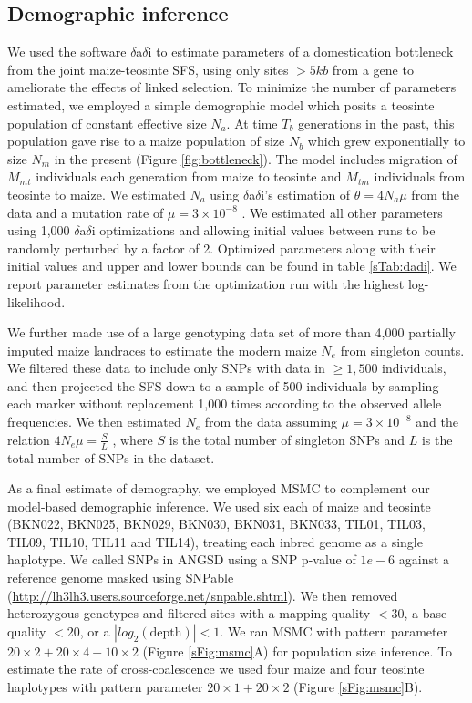 \documentclass[12pt,a4paper]{article}
\begin{document}
\subsection*{Demographic inference}
We used the software $\delta$a$\delta$i \cite{gutenkunst2009} to estimate parameters of a domestication bottleneck from the joint maize-teosinte SFS, using only sites $>5 kb$ from a gene to ameliorate the effects of linked selection.
To minimize the number of parameters estimated, we employed a simple demographic model which posits a teosinte population of constant effective size $N_a$.  At time $T_b$ generations in the past, this population gave rise to a maize population of size $N_b$ which grew exponentially to size $N_m$ in the present (Figure \ref{fig:bottleneck}).
The model includes migration of $M_{mt}$ individuals each generation from maize to teosinte and $M_{tm}$ individuals from teosinte to maize.  We estimated $N_a$ using $\delta$a$\delta$i's estimation of $\theta=4N_a\mu$ from the data and a mutation rate of $\mu = 3 \times 10^{-8}$ \cite{clark2005}. 
We estimated all other parameters using 1,000 $\delta$a$\delta$i optimizations and allowing initial values between runs to be randomly perturbed by a factor of 2.  
Optimized parameters along with their initial values and upper and lower bounds can be found in table \ref{sTab:dadi}. We report parameter estimates from the optimization run with the highest log-likelihood.

We further made use of a large genotyping data set of more than 4,000 partially imputed maize landraces \cite{Hearne2015} to estimate the modern maize $N_e$ from singleton counts. 
We filtered these data to include only SNPs with data in $\geq 1,500$ individuals, and then projected the SFS down to a sample of 500 individuals by sampling each marker without replacement 1,000 times according to the observed allele frequencies.
We then estimated $N_e$ from the data assuming $\mu = 3 \times 10^{-8}$ \cite{clark2005} and the relation  $4N_e\mu = \frac{S}{L}$ \cite{fu1993}, where $S$ is the total number of singleton SNPs and $L$ is the total number of SNPs in the dataset.

As a final estimate of demography, we employed MSMC \cite{schiffels2014}  to complement our model-based demographic inference. 
We used six each of maize and teosinte (BKN022, BKN025, BKN029, BKN030, BKN031, BKN033, TIL01, TIL03, TIL09, TIL10, TIL11 and TIL14), treating each inbred genome as a single haplotype.
We called SNPs in ANGSD \cite{korneliussen2014} using a SNP p-value of $1e-6$ against a reference genome masked using SNPable (\url{http://lh3lh3.users.sourceforge.net/snpable.shtml}). 
We then removed heterozygous genotypes and filtered sites with a mapping quality $<30$, a base quality $<20$, or a $|\textit{log}_2(\text{depth})|<1$.
We ran MSMC with pattern parameter $20\times2+20\times4+10\times2$ (Figure \ref{sFig:msmc}A) for population size inference. To estimate the rate of cross-coalescence we used four maize and four teosinte haplotypes with pattern parameter $20\times1 + 20\times2$ (Figure \ref{sFig:msmc}B).
\end{document}

